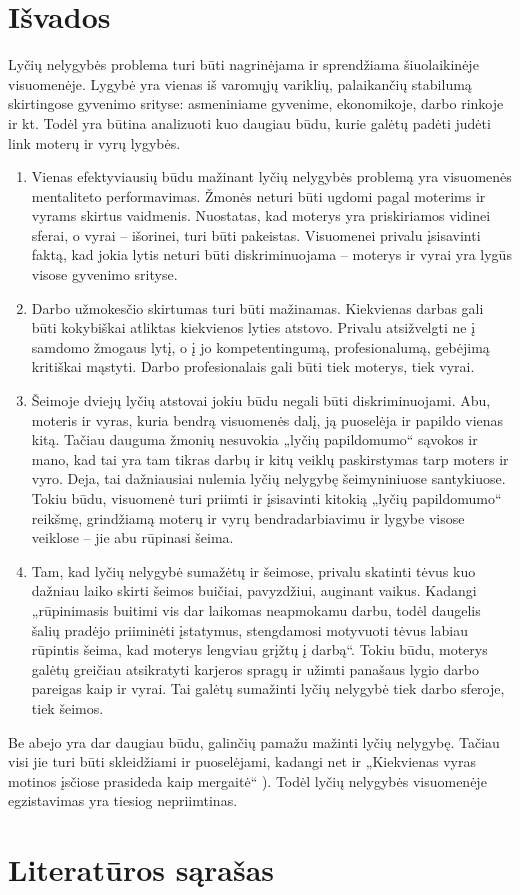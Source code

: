 \documentclass[titlepage, 11pt]{article}
\begin{document}
\section{Išvados}
Lyčių nelygybės problema turi būti nagrinėjama ir sprendžiama šiuolaikinėje visuomenėje. Lygybė yra vienas iš varomųjų variklių, palaikančių stabilumą skirtingose gyvenimo srityse: asmeniniame gyvenime, ekonomikoje, darbo rinkoje ir kt. Todėl yra būtina analizuoti kuo daugiau būdu, kurie galėtų padėti judėti link moterų ir vyrų lygybės. 
\begin{enumerate}
\item Vienas efektyviausių būdu mažinant lyčių nelygybės problemą yra visuomenės mentaliteto performavimas. Žmonės neturi būti ugdomi pagal moterims ir vyrams skirtus vaidmenis. Nuostatas, kad moterys yra priskiriamos vidinei sferai, o vyrai – išorinei, turi būti pakeistas. Visuomenei privalu įsisavinti faktą, kad jokia lytis neturi būti diskriminuojama – moterys ir vyrai yra lygūs visose gyvenimo srityse.
\item Darbo užmokesčio skirtumas turi būti mažinamas. Kiekvienas darbas gali būti kokybiškai atliktas kiekvienos lyties atstovo. Privalu atsižvelgti ne į samdomo žmogaus lytį, o į jo kompetentingumą, profesionalumą, gebėjimą kritiškai mąstyti. Darbo profesionalais gali būti tiek moterys, tiek vyrai.
\item Šeimoje dviejų lyčių atstovai jokiu būdu negali būti diskriminuojami. Abu, moteris ir vyras, kuria bendrą visuomenės dalį, ją puoselėja ir papildo vienas kitą. Tačiau dauguma žmonių nesuvokia „lyčių papildomumo“ sąvokos ir mano, kad tai yra tam tikras darbų ir kitų veiklų paskirstymas tarp moters ir vyro. Deja, tai dažniausiai nulemia lyčių nelygybę šeimyniniuose santykiuose. Tokiu būdu, visuomenė turi priimti ir įsisavinti kitokią „lyčių papildomumo“ reikšmę, grindžiamą moterų ir vyrų bendradarbiavimu ir lygybe visose veiklose – jie abu rūpinasi šeima.
\item Tam, kad lyčių nelygybė sumažėtų ir šeimose, privalu skatinti tėvus kuo dažniau  laiko skirti šeimos buičiai, pavyzdžiui, auginant vaikus. Kadangi „rūpinimasis buitimi vis dar laikomas neapmokamu darbu, todėl daugelis šalių pradėjo priiminėti įstatymus, stengdamosi motyvuoti tėvus labiau rūpintis šeima, kad moterys lengviau grįžtų į darbą“. Tokiu būdu, moterys galėtų greičiau atsikratyti karjeros spragų ir užimti panašaus lygio darbo pareigas kaip ir vyrai. Tai galėtų sumažinti lyčių nelygybė tiek darbo sferoje, tiek šeimos.
\end{enumerate}
Be abejo yra dar daugiau būdu, galinčių pamažu mažinti lyčių nelygybę. Tačiau visi jie turi būti skleidžiami ir puoselėjami, kadangi net ir „Kiekvienas vyras motinos įsčiose prasideda kaip mergaitė“ \cite{vanagaite2017jis} ). Todėl lyčių nelygybės visuomenėje egzistavimas yra tiesiog nepriimtinas.
\section{Literatūros sąrašas}
\nocite{*}
\printbibliography[title={Naudota literatūra}]
\end{document}

